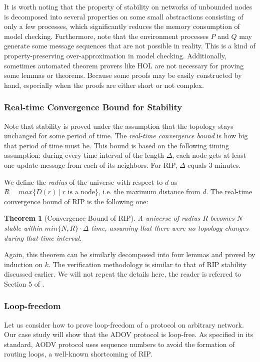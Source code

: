\documentclass[a4paper,10pt,twocolumn]{article}
\newtheorem{theorem}{Theorem}
\begin{document}
It is worth noting that the property of stability on networks of unbounded nodes is decomposed into several properties on some small abstractions consisting of only a few processes, which significantly reduces the memory consumption of model checking. Furthermore, note that the environment processes $P$ and $Q$ may generate some message sequences that are not possible in reality. This is a kind of property-preserving over-approximation in model checking. Additionally, sometimes automated theorem provers like HOL are not necessary for proving some lemmas or theorems. Because some proofs may be easily constructed by hand, especially when the proofs are either short or not complex.

\subsubsection{Real-time Convergence Bound for Stability}
Note that stability is proved under the assumption that the topology stays unchanged for some period of time. The \emph{real-time convergence bound} is how big that period of time must be. This bound is based on the following timing assumption: during every time interval of the length $\Delta$, each node gets at least one update message from each of its neighbors. For RIP, $\Delta$ equals 3 minutes.

We define the \emph{radius} of the universe with respect to $d$ as $R=max\{D(r)~|~r\text{ is a node}\}$, i.e. the maximum distance from $d$. The real-time convergence bound of RIP is the following one:
\begin{theorem}[Convergence Bound of RIP]
A universe of radius $R$ becomes $N$-stable within $min\{N,R\}\cdot \Delta$ time, assuming that there were no topology changes during that time interval.
\end{theorem}

Again, this theorem can be similarly decomposed into four lemmas and proved by induction on $k$. The verification methodology is similar to that of RIP stability discussed earlier. We will not repeat the details here, the reader is referred to Section 5 of \cite{BOG02}.

\subsubsection{Loop-freedom}
Let us consider how to prove loop-freedom of a protocol on arbitrary network. Our case study will show that the ADOV protocol is loop-free. As specified in its standard, AODV protocol uses sequence numbers to avoid the formation of routing loops, a well-known shortcoming of RIP.
\end{document}
